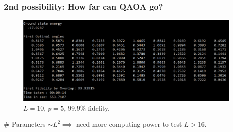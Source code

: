 \documentclass{beamer}
\theoremstyle{definition}
\begin{document}

\begin{frame}
\frametitle{2nd possibility: How far can QAOA go?}





\begin{figure}
	\centering
	\includegraphics[scale=0.55]{N10p5_out}
	\caption{$L=10$, $p=5$, 99.9\% fidelity.}
\end{figure}

\# Parameters $\sim L^2 \implies$ need more computing power to test $L > 16$. 
\end{frame}


\end{document}
